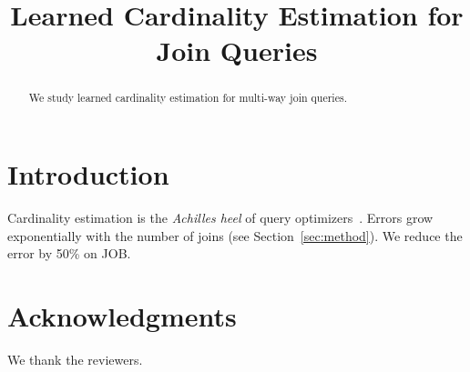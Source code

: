 \documentclass{article}
\title{Learned Cardinality Estimation for Join Queries}
\begin{document}
\maketitle
\begin{abstract}
We study learned cardinality estimation for multi-way join queries.
\end{abstract}

\section{Introduction}
\label{sec:intro}
Cardinality estimation is the \emph{Achilles heel} of query optimizers~\cite{leis2015}.
Errors grow exponentially with the number of joins (see Section~\ref{sec:method}).
We reduce the error by 50\% on JOB.



\section*{Acknowledgments}
We thank the reviewers.



\end{document}
